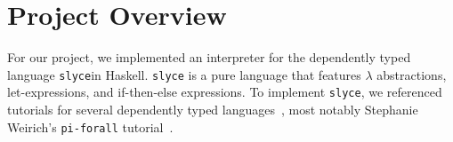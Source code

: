 \section{Project Overview}
For our project, we implemented an interpreter for the dependently typed language \texttt{slyce}\footnotemark in Haskell.
\texttt{slyce} is a pure language that features $\lambda$ abstractions, let-expressions, and if-then-else expressions.
To implement \texttt{slyce}, we referenced tutorials for several dependently typed languages~\cite{friedman2018little, loh2010tutorial}, most notably Stephanie Weirich's \texttt{pi-forall} tutorial~\cite{weirich2022implementing}.

